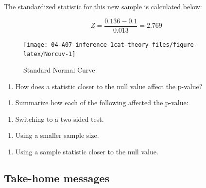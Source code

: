 \documentclass[
]{report}
\providecommand{\tightlist}{%
  \setlength{\itemsep}{0pt}\setlength{\parskip}{0pt}}
\begin{document}
The standardized statistic for this new sample is calculated below:

\[Z = \frac{0.136-0.1}{0.013} = 2.769\]

\begin{figure}

{\centering \texttt{[image: 04-A07-inference-1cat-theory\_files/figure-latex/Norcuv-1]} 

}

\caption{Standard Normal Curve}\label{fig:Norcuv}
\end{figure}

\begin{enumerate}
\def\labelenumi{\arabic{enumi}.}
\setcounter{enumi}{12}
\tightlist
\item
  How does a statistic closer to the null value affect the p-value?
\end{enumerate}

\vspace{0.3in}

\newpage

\begin{enumerate}
\def\labelenumi{\arabic{enumi}.}
\setcounter{enumi}{13}
\tightlist
\item
  Summarize how each of the following affected the p-value:
\end{enumerate}

\begin{enumerate}
\def\labelenumi{\alph{enumi})}
\tightlist
\item
  Switching to a two-sided test.
\end{enumerate}

\vspace{0.4in}

\begin{enumerate}
\def\labelenumi{\alph{enumi})}
\setcounter{enumi}{1}
\tightlist
\item
  Using a smaller sample size.
\end{enumerate}

\vspace{0.4in}

\begin{enumerate}
\def\labelenumi{\alph{enumi})}
\setcounter{enumi}{2}
\tightlist
\item
  Using a sample statistic closer to the null value.
\end{enumerate}

\vspace{0.4in}

\subsection{Take-home messages}\label{take-home-messages-6}
\end{document}
